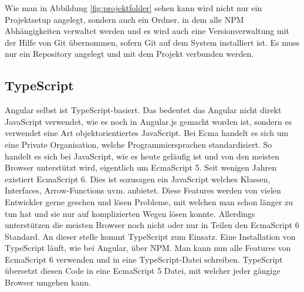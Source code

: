 Wie man in Abbildung \ref{fig:projektfolder} sehen kann wird nicht nur ein Projektsetup angelegt, sondern auch ein Ordner, in dem alle \ac{NPM} Abhängigkeiten verwaltet werden und es wird auch eine Versionverwaltung mit der Hilfe von Git übernommen, sofern Git auf dem System installiert ist. Es muss nur ein Repository angelegt und mit dem Projekt verbunden werden.




\subsection{TypeScript}
Angular selbst ist TypeScript-basiert. Das bedeutet das Angular nicht direkt JavaScript verwendet, wie es noch in Angular.js gemacht worden ist, sondern es verwendet eine Art objektorientiertes JavaScript. Bei \ac{Ecma} handelt es sich um eine Private Organisation, welche Programmiersprachen standardisiert. So handelt es sich bei JavaScript, wie es heute geläufig ist und von den meisten Browser unterstützt wird, eigentlich um EcmaScript 5. Seit wenigen Jahren existiert EcmaScript 6. Dies ist sozusagen ein JavaScript welches Klassen, Interfaces, Arrow-Functions \ac{uvm.} anbietet. Diese Features werden von vielen Entwickler gerne gesehen und lösen Probleme, mit welchen man schon länger zu tun hat und sie nur auf komplizierten Wegen lösen konnte. Allerdings unterstützen die meisten Browser noch nicht oder nur in Teilen den EcmaScript 6 Standard. An dieser stelle kommt TypeScript zum Einsatz. Eine Installation von TypeScript läuft, wie bei Angular, über \ac{NPM}. Man kann nun alle Features von EcmaScript 6 verwenden und in eine TypeScript-Datei schreiben. TypeScript übersetzt diesen Code in eine EcmaScript 5 Datei, mit welcher jeder gängige Browser umgehen kann.

